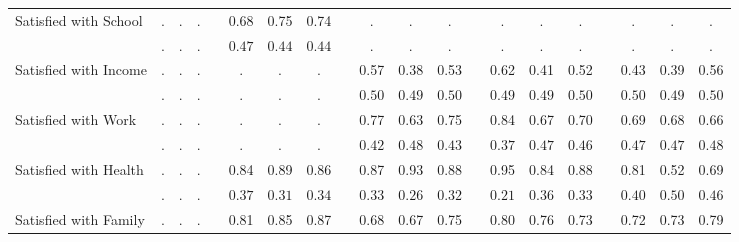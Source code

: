 \begin{center}
{\begin{longtable}{L{5cm} c c c p{.5cm} c c c p{.5cm} c c c p{.5cm} c c c p{.5cm} c c c}
Satisfied with School & . &         . &         . & &      0.68 &      0.75 &      0.74 & &         . &         . &         . & &         . &         . &         . & &         . &         . &         . \\*
& $\mathit{        .}$ & $\mathit{        .}$ & $\mathit{        .}$ & & $\mathit{     0.47}$ & $\mathit{     0.44}$ & $\mathit{     0.44}$ & & $\mathit{        .}$ & $\mathit{        .}$ & $\mathit{        .}$ & & $\mathit{        .}$ & $\mathit{        .}$ & $\mathit{        .}$ & & $\mathit{        .}$ & $\mathit{        .}$ & $\mathit{        .}$ \\[.7em]
Satisfied with Income & . &         . &         . & &         . &         . &         . & &      0.57 &      0.38 &      0.53 & &      0.62 &      0.41 &      0.52 & &      0.43 &      0.39 &      0.56 \\*
& $\mathit{        .}$ & $\mathit{        .}$ & $\mathit{        .}$ & & $\mathit{        .}$ & $\mathit{        .}$ & $\mathit{        .}$ & & $\mathit{     0.50}$ & $\mathit{     0.49}$ & $\mathit{     0.50}$ & & $\mathit{     0.49}$ & $\mathit{     0.49}$ & $\mathit{     0.50}$ & & $\mathit{     0.50}$ & $\mathit{     0.49}$ & $\mathit{     0.50}$ \\[.7em]
Satisfied with Work & . &         . &         . & &         . &         . &         . & &      0.77 &      0.63 &      0.75 & &      0.84 &      0.67 &      0.70 & &      0.69 &      0.68 &      0.66 \\*
& $\mathit{        .}$ & $\mathit{        .}$ & $\mathit{        .}$ & & $\mathit{        .}$ & $\mathit{        .}$ & $\mathit{        .}$ & & $\mathit{     0.42}$ & $\mathit{     0.48}$ & $\mathit{     0.43}$ & & $\mathit{     0.37}$ & $\mathit{     0.47}$ & $\mathit{     0.46}$ & & $\mathit{     0.47}$ & $\mathit{     0.47}$ & $\mathit{     0.48}$ \\[.7em]
Satisfied with Health & . &         . &         . & &      0.84 &      0.89 &      0.86 & &      0.87 &      0.93 &      0.88 & &      0.95 &      0.84 &      0.88 & &      0.81 &      0.52 &      0.69 \\*
& $\mathit{        .}$ & $\mathit{        .}$ & $\mathit{        .}$ & & $\mathit{     0.37}$ & $\mathit{     0.31}$ & $\mathit{     0.34}$ & & $\mathit{     0.33}$ & $\mathit{     0.26}$ & $\mathit{     0.32}$ & & $\mathit{     0.21}$ & $\mathit{     0.36}$ & $\mathit{     0.33}$ & & $\mathit{     0.40}$ & $\mathit{     0.50}$ & $\mathit{     0.46}$ \\[.7em]
Satisfied with Family & . &         . &         . & &      0.81 &      0.85 &      0.87 & &      0.68 &      0.67 &      0.75 & &      0.80 &      0.76 &      0.73 & &      0.72 &      0.73 &      0.79 \\*

\end{longtable}}
\end{center}
